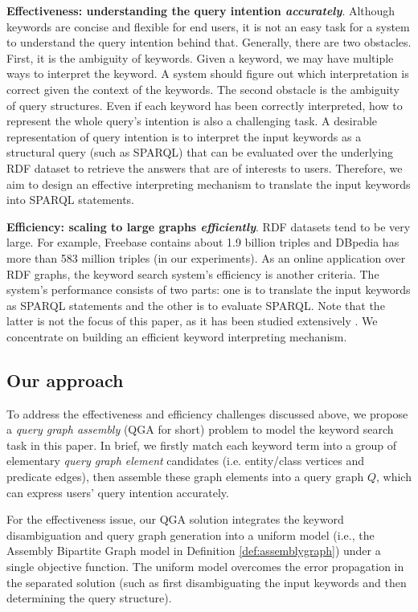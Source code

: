 \textbf{Effectiveness: understanding the query intention \emph{accurately}}. Although keywords are concise and flexible for end users, it is not an easy task for a system to understand the query intention behind that. Generally, there are two obstacles. First, it is the ambiguity of keywords. Given a keyword, we may have multiple ways to interpret the keyword. A system should figure out which interpretation is correct given the context of the keywords. The second obstacle is the ambiguity of query structures. Even if each keyword has been correctly interpreted, how to represent the whole query's intention is also a challenging task.
A desirable representation of query intention is to interpret the input keywords as a structural query (such as SPARQL) that can be evaluated over the underlying RDF dataset to retrieve the answers that are of interests to users. Therefore, we aim to design an effective interpreting mechanism to translate the input keywords into SPARQL statements.  
	
\textbf{Efficiency: scaling to large graphs \emph{efficiently}}. RDF datasets tend to be very large. For example, Freebase contains about 1.9 billion triples and DBpedia has more than 583 million triples (in our experiments). As an online application over RDF graphs, the keyword search system's efficiency is another criteria. The system's performance consists of two parts: one is to translate the input keywords as SPARQL statements and the other is to evaluate SPARQL. Note that the latter is not the focus of this paper, as it has been studied extensively \cite{zou2014gstore,shi16fast}. We concentrate on building an efficient keyword interpreting mechanism.  

\subsection{Our approach}
To address the effectiveness and efficiency challenges discussed above, we propose a \emph{query graph assembly} (QGA for short) problem to model the keyword search task in this paper. In brief, we firstly match each keyword term into a group of elementary \emph{query graph element} candidates (i.e. entity/class vertices and predicate edges), then assemble these graph elements into a query graph $Q$, which can express users' query intention accurately. 

For the effectiveness issue, our QGA solution integrates the keyword disambiguation and query graph generation into a uniform model (i.e., the Assembly Bipartite Graph model in Definition \ref{def:assemblygraph}) under a single objective function. The uniform model overcomes the error propagation in the separated solution (such as first disambiguating the input keywords and then determining the query structure). 

